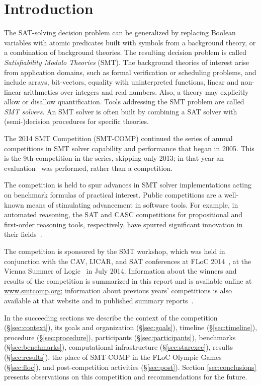 \documentclass[twoside,11pt]{article}
\begin{document}
	
\section{Introduction}
\label{sec:intro}

The SAT-solving decision problem can be generalized by replacing
Boolean variables with atomic predicates built with symbols from a
background theory, or a combination of background theories. The
resulting decision problem is called \emph{Satisfiability Modulo
  Theories\/} (SMT). The background theories of interest arise from 
	application domains, such as formal verification or scheduling problems, and include arrays,
bit-vectors, equality with uninterpreted functions, linear and
non-linear arithmetics over integers and real numbers. Also, a theory
may explicitly allow or disallow quantification. Tools addressing the
SMT problem are called \emph{SMT solvers\/}. An SMT solver is often
built by combining a SAT solver with (semi-)decision procedures for
specific theories.

The 2014 SMT Competition (SMT-COMP) continued the series of annual competitions in SMT solver capability and performance that began in 2005. This is the 9th competition in the series, skipping only 2013; in that year an evaluation~\cite{it:2014-017} was performed, rather than a competition.

The competition is held to spur advances in
SMT solver implementations acting on benchmark formulas of practical interest. Public competitions are
a well-known means of stimulating advancement in software tools. For example, in automated
reasoning, the SAT and CASC competitions for propositional and first-order reasoning tools, respectively,
have spurred significant innovation in their fields~\cite{leberre+03,PSS02}.

The competition is sponsored by the SMT workshop, which was held in conjunction with the
CAV, IJCAR, and SAT conferences at FLoC 2014~\cite{FLoC2014}, at the Vienna Summer of Logic~\cite{VSL} in July 2014.
Information about the winners
and results of the competition is summarized in this report and is available online at \url{www.smtcomp.org}; information
about previous years' competitions is also available at that website and in published summary reports~\cite{springerlink:10.1007/s10817-012-9246-5,DBLP:conf/cade/CokGBD12,it:2014-017}.

In the succeeding sections we describe the context of the competition (\S\ref{sec:context}), its goals and organization (\S\ref{sec:goals}), timeline (\S\ref{sec:timeline}), procedure (\S\ref{sec:procedure}), participants (\S\ref{sec:participants}), benchmarks (\S\ref{sec:benchmarks}), computational infrastructure (\S\ref{sec:starexec}), results (\S\ref{sec:results}), the place of SMT-COMP in the FLoC Olympic Games (\S\ref{sec:floc}), and post-competition activities (\S\ref{sec:post}). Section \ref{sec:conclusions} presents observations on this competition and recommendations for the future.
\end{document}
